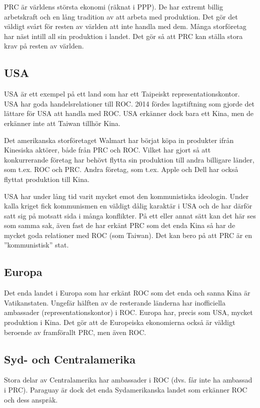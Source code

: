 \documentclass[a4paper,10pt]{article}
\begin{document}
PRC är världens största ekonomi (räknat i PPP). De har extremt billig arbetskraft och en lång tradition av att arbeta med produktion. Det gör det väldigt svårt för resten av världen att inte handla med dem. Många storföretag har näst intill all sin produktion i landet. Det gör så att PRC kan ställa stora krav på resten av världen.

\subsection*{USA}
USA är ett exempel på ett land som har ett Taipeiskt representationskontor. USA har goda handelsrelationer till ROC. 2014 fördes lagstiftning som gjorde det lättare för USA att handla med ROC. USA erkänner dock bara ett Kina, men de erkänner inte att Taiwan tillhör Kina.

Det amerikanska storföretaget Walmart har börjat köpa in produkter ifrån Kinesiska aktörer, både från PRC och ROC. Vilket har gjort så att konkurrerande företag har behövt flytta sin produktion till andra billigare länder, som t.ex. ROC och PRC. Andra företag, som t.ex. Apple och Dell har också flyttat produktion till Kina.

USA har under lång tid varit mycket emot den kommunistiska ideologin. Under kalla kriget fick kommunismen en väldigt dålig karaktär i USA och de har därför satt sig på motsatt sida i många konflikter. På ett eller annat sätt kan det här ses som samma sak, även fast de har erkänt PRC som det enda Kina så har de mycket goda relationer med ROC (som Taiwan). Det kan bero på att PRC är en ''kommunistisk'' stat.

\subsection*{Europa}
Det enda landet i Europa som har erkänt ROC som det enda och sanna Kina är Vatikanstaten. Ungefär hälften av de resterande länderna har inofficiella ambassader (representationskontor) i ROC. Europa har, precis som USA, mycket produktion i Kina. Det gör att de Europeiska ekonomierna också är väldigt beroende av framförallt PRC, men även ROC. 

\subsection*{Syd- och Centralamerika}
Stora delar av Centralamerika har ambassader i ROC (dvs. får inte ha ambassad i PRC). Paraguay är dock det enda Sydamerikanska landet som erkänner ROC och dess anspråk.
\end{document}
